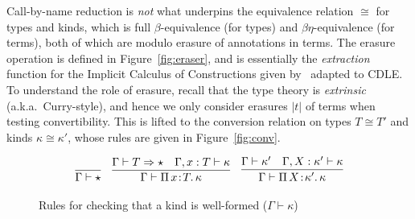 \documentclass{article}
\newcommand{\abs}[4]{{#1}\, #2\! : \! #3.\, #4}
\newcommand{\tpsynth}[0]{\Rightarrow}
\begin{document}
Call-by-name reduction is \emph{not} what underpins the
equivalence relation \(\cong\) for types and kinds, which is full
\(\beta\)-equivalence (for types) and \(\beta\eta\)-equivalence (for terms),
both of which are modulo erasure of annotations in terms.
The erasure operation is defined in Figure~\ref{fig:eraser}, and is essentially
the \emph{extraction} function for the Implicit Calculus of Constructions given
by~\cite{BB08_ICC-as-a-Programming-Language} adapted to CDLE.
To understand the role of erasure, recall that the type theory is \emph{extrinsic} (a.k.a.\
Curry-style), and hence we only consider erasures \(|t|\) of terms when testing
convertibility.
This is lifted to the conversion relation on types \(T \cong T'\) and kinds
\(\kappa \cong \kappa'\), whose rules are given in
Figure~\ref{fig:conv}.

\begin{figure}
  \[
  \begin{array}{ccc}
    \infer{\Gamma \vdash \star}{\ } &
    \infer{\Gamma\vdash\abs{\Pi}{x}{T}{\kappa}}{\Gamma \vdash T \tpsynth \star & \Gamma,x:T\vdash\kappa} &
    \infer{\Gamma\vdash\abs{\Pi}{X}{\kappa'}{\kappa}}{\Gamma \vdash \kappa' & \Gamma,X:\kappa'\vdash\kappa}
  \end{array}
  \]
  \caption{Rules for checking that a kind is well-formed ($\Gamma \vdash \kappa$)}
  \label{fig:superknd}
\end{figure}
\end{document}
